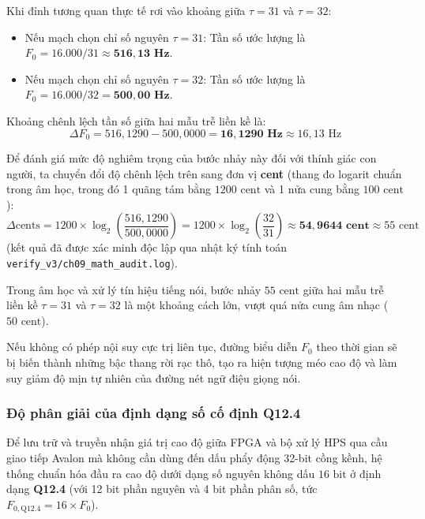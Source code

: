 Khi đỉnh tương quan thực tế rơi vào khoảng giữa $\tau = 31$ và $\tau = 32$:
\begin{itemize}[leftmargin=1.5em, itemsep=2pt]
    \item Nếu mạch chọn chỉ số nguyên $\tau = 31$: Tần số ước lượng là $F_0 = 16.000 / 31 \approx \mathbf{516{,}13\text{ Hz}}$.
    \item Nếu mạch chọn chỉ số nguyên $\tau = 32$: Tần số ước lượng là $F_0 = 16.000 / 32 = \mathbf{500{,}00\text{ Hz}}$.
\end{itemize}

Khoảng chênh lệch tần số giữa hai mẫu trễ liền kề là:
\begin{equation}
\Delta F_0 = 516{,}1290 - 500{,}0000 = \mathbf{16{,}1290\text{ Hz}} \approx 16{,}13\text{ Hz}
\end{equation}

Để đánh giá mức độ nghiêm trọng của bước nhảy này đối với thính giác con người, ta chuyển đổi độ chênh lệch trên sang đơn vị \textbf{cent} (thang đo logarit chuẩn trong âm học, trong đó 1 quãng tám bằng $1200\text{ cent}$ và 1 nửa cung bằng $100\text{ cent}$):
\begin{equation}
\Delta \text{cents} = 1200 \times \log_2\left( \frac{516{,}1290}{500{,}0000} \right) = 1200 \times \log_2\left( \frac{32}{31} \right) \approx \mathbf{54{,}9644\text{ cent}} \approx 55\text{ cent}
\end{equation}
(kết quả đã được xác minh độc lập qua nhật ký tính toán \texttt{verify\_v3/ch09\_math\_audit.log}).

\begin{physicalinsight}
Trong âm học và xử lý tín hiệu tiếng nói, bước nhảy $55\text{ cent}$ giữa hai mẫu trễ liền kề $\tau = 31$ và $\tau = 32$ là một khoảng cách lớn, vượt quá nửa cung âm nhạc ($50\text{ cent}$). 

Nếu không có phép nội suy cực trị liên tục, đường biểu diễn $F_0$ theo thời gian sẽ bị biến thành những bậc thang rời rạc thô, tạo ra hiện tượng méo cao độ và làm suy giảm độ mịn tự nhiên của đường nét ngữ điệu giọng nói.
\end{physicalinsight}

\subsubsection*{Độ phân giải của định dạng số cố định Q12.4}
Để lưu trữ và truyền nhận giá trị cao độ giữa FPGA và bộ xử lý HPS qua cầu giao tiếp Avalon mà không cần dùng đến dấu phẩy động 32-bit cồng kềnh, hệ thống chuẩn hóa đầu ra cao độ dưới dạng số nguyên không dấu $16\text{ bit}$ ở định dạng \textbf{Q12.4} (với 12 bit phần nguyên và 4 bit phần phân số, tức $F_{0, \text{Q12.4}} = 16 \times F_0$).

